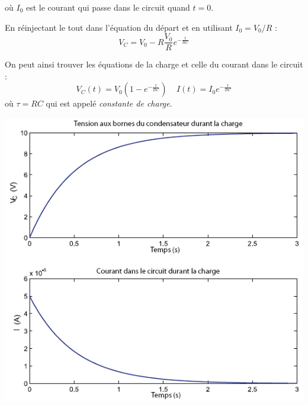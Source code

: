 \documentclass	[11pt, a4paper, openany]{book}
\begin{document}
où $I_0$ est le courant qui passe dans le circuit quand $t = 0$.

En réinjectant le tout dans l'équation du départ et en utilisant $I_0 = V_0/R$ :
\begin{equation}
V_C = V_0 - R\frac{V_0}{R}e^{-\frac{t}{RC}}
\end{equation}

On peut ainsi trouver les équations de la charge et celle du courant dans le circuit : 
\begin{equation}
V_C(t) = V_0\left(1-e^{-\frac{t}{RC}}\right)\ \ \ \ \ I(t) = I_0e^{-\frac{t}{RC}}
\end{equation}
où $\tau = RC$ qui est appelé \textit{constante de charge}.
\begin{center}
\includegraphics[scale=0.5]{labo/image14.png}
\end{center}
\end{document}
